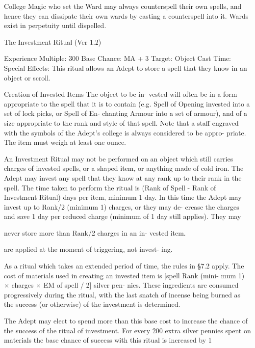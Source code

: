 \begin{Chapter}{College Magic}
who  set  the  Ward  may  always  counterspell  their 
own spells, and hence they can dissipate their own 
wards by casting a counterspell into it. Wards exist 
in perpetuity until dispelled. 

The Investment Ritual (Ver 1.2) 

Experience Multiple: 300 
Base Chance: MA + 3%
Target: Object 
Cast Time: Special 
Effects: This ritual allows an Adept to store a spell 
that they know in an object or scroll. 

Creation  of  Invested  Items  The  object  to  be  in-
vested  will  often  be  in  a  form  appropriate  to  the 
spell  that  it  is  to  contain  (e.g.  Spell  of  Opening 
invested  into  a  set  of  lock  picks,  or  Spell  of  En-
chanting  Armour  into  a  set  of  armour),  and  of  a 
size appropriate to the rank and style of that spell. 
Note that a staff engraved with the symbols  of the 
Adept’s  college  is  always  considered  to  be  appro-
priate. The item must weigh at least one ounce. 

An Investment Ritual may not be performed on an 
object which still carries charges of invested spells, 
or  a  shaped  item,  or  anything  made  of  cold  iron. 
The  Adept  may  invest  any  spell  that they  know  at 
any  rank  up  to  their  rank  in  the  spell.  The  time 
taken to perform the ritual is (Rank of Spell - Rank 
of  Investment  Ritual)  days  per  item,  minimum  1 
day.  In  this  time  the  Adept  may  invest  up  to 
Rank/2  (minimum  1)  charges,  or  they  may  de-
crease  the  charges  and  save  1  day  per  reduced 
charge (minimum of 1 day still applies). They may 

never  store  more  than  Rank/2  charges  in  an  in-
vested item. 

are applied at the moment of triggering, not invest-
ing. 

As a ritual which takes an extended period of time, 
the rules in §7.2 apply. The cost of  materials used 
in  creating  an  invested  item  is  [spell  Rank  (mini-
mum  1)  ×  charges  ×  EM  of  spell  /  2]  silver  pen-
nies. These ingredients are consumed progressively 
during  the  ritual,  with  the  last  snatch  of  incense 
being  burned  as  the  success  (or  otherwise)  of  the 
investment is determined. 

The  Adept may elect to spend more than this base 
cost  to  increase  the  chance  of  the  success  of  the 
ritual  of  investment.  For  every  200  extra  silver 
pennies  spent  on  materials  the  base  chance  of 
success with this ritual is increased by 1%


\end{Chapter}
